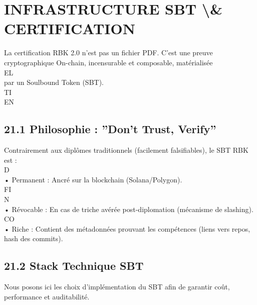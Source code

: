 \documentclass[12pt,landscape,a4paper]{article}
\begin{document}
\section{INFRASTRUCTURE SBT \textbackslash{}& CERTIFICATION}
\vspace{0.5em}
\vspace{0.5em}
La certification RBK 2.0 n’est pas un fichier PDF. C’est une preuve cryptographique On-chain, incensurable et composable, matérialisée\\
\vspace{0.5em}
\vspace{0.5em}
\vspace{0.5em}
\vspace{0.5em}
EL\\
par un Soulbound Token (SBT).\\
\vspace{0.5em}
\vspace{0.5em}
\vspace{0.5em}
\vspace{0.5em}
TI\\
EN\\
\subsection{21.1 Philosophie : ”Don’t Trust, Verify”}
Contrairement aux diplômes traditionnels (facilement falsifiables), le SBT RBK est :\\
\vspace{0.5em}
\vspace{0.5em}
\vspace{0.5em}
\vspace{0.5em}
D\\
• Permanent : Ancré sur la blockchain (Solana/Polygon).\\
\vspace{0.5em}
\vspace{0.5em}
\vspace{0.5em}
FI\\
N\\
• Révocable : En cas de triche avérée post-diplomation (mécanisme de slashing).\\
CO\\
• Riche : Contient des métadonnées prouvant les compétences (liens vers repos, hash des commits).\\
\vspace{0.5em}
\vspace{0.5em}
\subsection{21.2 Stack Technique SBT}
Nous posons ici les choix d’implémentation du SBT afin de garantir coût, performance et auditabilité.\\
\vspace{0.5em}
\vspace{0.5em}
\end{document}
